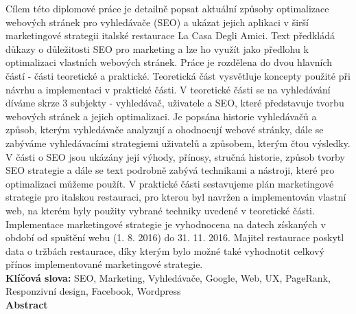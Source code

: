 Cílem této diplomové práce je detailně popsat aktuální způsoby optimalizace webových stránek pro vyhledávače (SEO) a ukázat jejich aplikaci v širší marketingové strategii italské restaurace La Casa Degli Amici. Text předkládá důkazy o důležitosti SEO pro marketing a lze ho využít jako předlohu k optimalizaci vlastních webových stránek. Práce je rozdělena do dvou hlavních částí - části teoretické a praktické. Teoretická část vysvětluje koncepty použité při návrhu a implementaci v praktické části. V teoretické části se na vyhledávání díváme skrze 3 subjekty - vyhledávač, uživatele a SEO, které představuje tvorbu webových stránek a jejich optimalizaci. Je popsána historie vyhledávačů a způsob, kterým vyhledávače analyzují a ohodnocují webové stránky, dále se zabýváme vyhledávacími strategiemi uživatelů a způsobem, kterým čtou výsledky. V části o SEO jsou ukázány její výhody, přínosy, stručná historie, způsob tvorby SEO strategie a dále se text podrobně zabývá technikami a nástroji, které pro optimalizaci můžeme použít. V praktické části sestavujeme plán marketingové strategie pro italskou restauraci, pro kterou byl navržen a implementován vlastní web, na kterém byly použity vybrané techniky uvedené v teoretické části. Implementace marketingové strategie je vyhodnocena na datech získaných v období od spuštění webu (1. 8. 2016) do 31. 11. 2016. Majitel restaurace poskytl data o tržbách restaurace, díky kterým bylo možné také vyhodnotit celkový přínos implementované marketingové strategie. \\ 

\textbf{Klíčová slova:} SEO, Marketing, Vyhledávače, Google, Web, UX, PageRank, Responzivní design, Facebook, Wordpress\\

\textsf{\textbf{\Large{}Abstract}}\vspace{12pt}

